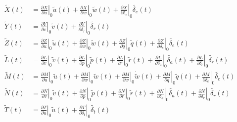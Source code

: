 \begin{align*}
    \widetilde{X}(t) & =  \left.\frac{\partial X}{\partial u}\right|_0\widetilde{u}(t) + \left.\frac{\partial X}{\partial w}\right|_0\widetilde{w}(t) + \left.\frac{\partial X}{\partial \delta_e}\right|_0\widetilde{\delta_e}(t)                                                                                                                                            \\
    \widetilde{Y}(t) & = \left.\frac{\partial Y}{\partial v}\right|_0\widetilde{v}(t) + \left.\frac{\partial Y}{\partial \delta_r}\right|_0\widetilde{\delta_r}(t)                                                                                                                                                                                                            \\
    \widetilde{Z}(t) & =  \left.\frac{\partial Z}{\partial u}\right|_0\widetilde{u}(t) + \left.\frac{\partial Z}{\partial w}\right|_0\widetilde{w}(t) + \left.\frac{\partial Z}{\partial q}\right|_0\widetilde{q}(t) + \left.\frac{\partial Z}{\partial \delta_e}\right|_0\widetilde{\delta_e}(t)                                                                             \\
    \widetilde{L}(t) & = \left.\frac{\partial L}{\partial v}\right|_0\widetilde{v}(t) + \left.\frac{\partial L}{\partial p}\right|_0\widetilde{p}(t) + \left.\frac{\partial L}{\partial r}\right|_0\widetilde{r}(t) + \left.\frac{\partial L}{\partial \delta_a}\right|_0\widetilde{\delta_a}(t) + \left.\frac{\partial L}{\partial \delta_r}\right|_0\widetilde{\delta_r}(t) \\
    \widetilde{M}(t) & = \left.\frac{\partial M}{\partial u}\right|_0\widetilde{u}(t) + \left.\frac{\partial M}{\partial w}\right|_0\widetilde{w}(t) + \left.\frac{\partial M}{\partial \dot{w}}\right|_0\dot{\widetilde{w}}(t)  + \left.\frac{\partial M}{\partial q}\right|_0\widetilde{q}(t) + \left.\frac{\partial M}{\partial \delta_e}\right|_0\widetilde{\delta_e}(t)  \\
    \widetilde{N}(t) & = \left.\frac{\partial N}{\partial v}\right|_0\widetilde{v}(t) + \left.\frac{\partial N}{\partial p}\right|_0\widetilde{p}(t) + \left.\frac{\partial N}{\partial r}\right|_0\widetilde{r}(t) + \left.\frac{\partial N}{\partial \delta_a}\right|_0\widetilde{\delta_a}(t) + \left.\frac{\partial N}{\partial \delta_r}\right|_0\widetilde{\delta_r}(t) \\
    \widetilde{T}(t) & = \left.\frac{\partial T}{\partial u}\right|_0\widetilde{u}(t) + \left.\frac{\partial T}{\partial \delta_t}\right|_0\widetilde{\delta_t}(t)                                                                                                                                                                                                            \\
\end{align*}

